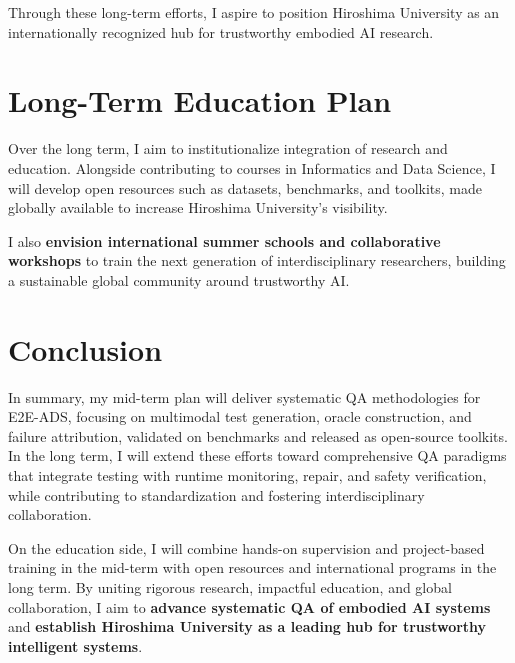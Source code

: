 \documentclass[12pt,a4paper]{article}
\begin{document}
Through these long-term efforts, I aspire to position Hiroshima University as an internationally recognized hub for trustworthy embodied AI research.

\section{Long-Term Education Plan}

Over the long term, I aim to institutionalize integration of research and education. Alongside contributing to courses in Informatics and Data Science, I will develop open resources such as datasets, benchmarks, and toolkits, made globally available to increase Hiroshima University’s visibility.

I also \textbf{envision international summer schools and collaborative workshops} to train the next generation of interdisciplinary researchers, building a sustainable global community around trustworthy AI.

\section{Conclusion}

In summary, my mid-term plan will deliver systematic QA methodologies for E2E-ADS, focusing on multimodal test generation, oracle construction, and failure attribution, validated on benchmarks and released as open-source toolkits. In the long term, I will extend these efforts toward comprehensive QA paradigms that integrate testing with runtime monitoring, repair, and safety verification, while contributing to standardization and fostering interdisciplinary collaboration.

On the education side, I will combine hands-on supervision and project-based training in the mid-term with open resources and international programs in the long term. By uniting rigorous research, impactful education, and global collaboration, I aim to \textbf{advance systematic QA of embodied AI systems} and \textbf{establish Hiroshima University as a leading hub for trustworthy intelligent systems}.




\vspace{10em} %
 
\end{document}
